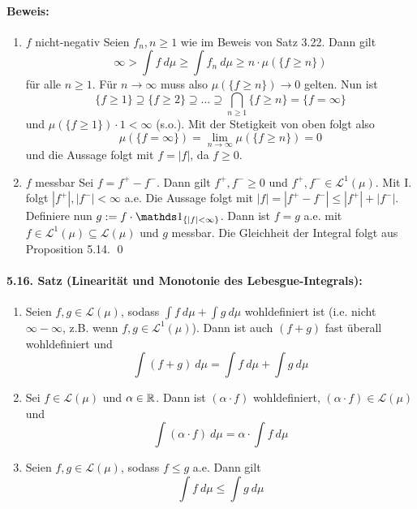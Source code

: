 \documentclass[12pt]{report}
\begin{document}
  \paragraph{Beweis:}
  \begin{enumerate}[label=\Roman*.]
      \item $f$ nicht-negativ\newline
      Seien $f_n,n\geq1$ wie im Beweis von Satz 3.22. Dann gilt
      $$\infty>\int f\ d\mu\geq\int f_n\ d\mu\geq n\cdot\mu(\{f\geq n\})$$
      f\"ur alle $n\geq1$. F\"ur $n\to\infty$ muss also $\mu(\{f\geq n\})\to0$ gelten. Nun ist
      $$\{f\geq1\}\supseteq\{f\geq2\}\supseteq\hdots\supseteq\bigcap_{n\geq1}\{f\geq n\}=\{f=\infty\}$$
      und $\mu(\{f\geq1\})\cdot 1<\infty$ (s.o.). Mit der Stetigkeit von oben folgt also 
      $$\mu(\{f=\infty\})=\lim_{n\to\infty}\mu(\{f\geq n\})=0$$
      und die Aussage folgt mit $f=|f|$, da $f\geq 0$.
      \item $f$ messbar\newline
      Sei $f=f^+-f^-$. Dann gilt $f^+,f^-\geq0$ und $f^+,f^-\in\mathcal{L}^1(\mu)$. Mit I. folgt $|f^+|,|f^-|<\infty$ a.e. Die Aussage folgt mit $|f|=|f^+-f^-|\leq|f^+|+|f^-|$. Definiere nun $g:=f\cdot\ind{\{|f|<\infty\}}$. Dann ist $f=g$ a.e. mit $f\in\mathcal{L}^1(\mu)\subseteq\mathcal{L}(\mu)$ und $g$ messbar. Die Gleichheit der Integral folgt aus Proposition 5.14. \qed
  \end{enumerate}
  
  \paragraph{5.16. Satz (Linearit\"at und Monotonie des Lebesgue-Integrals):}
  \begin{enumerate}[label=(\roman*)]
      \item Seien $f,g\in\mathcal{L}(\mu)$, sodass $\displaystyle\int f\ d\mu+\int g\ d\mu$ wohldefiniert ist (i.e. nicht $\infty-\infty$, z.B. wenn $f,g\in\mathcal{L}^1(\mu)$). Dann ist auch $(f+g)$ fast \"uberall wohldefiniert und 
      $$\int(f+g)\ d\mu=\int f\ d\mu+\int g\ d\mu$$
      \item Sei $f\in\mathcal{L}(\mu)$ und $\alpha\in\mathbb{R}$. Dann ist $(\alpha\cdot f)$ wohldefiniert, $(\alpha\cdot f)\in\mathcal{L}(\mu)$ und 
      $$\int (\alpha\cdot f)\ d\mu=\alpha\cdot\int f\ d\mu$$
      \item Seien $f,g\in\mathcal{L}(\mu)$, sodass $f\leq g$ a.e. Dann gilt
      $$\int f\ d\mu\leq\int g\ d\mu$$
  \end{enumerate}
 
\end{document}
